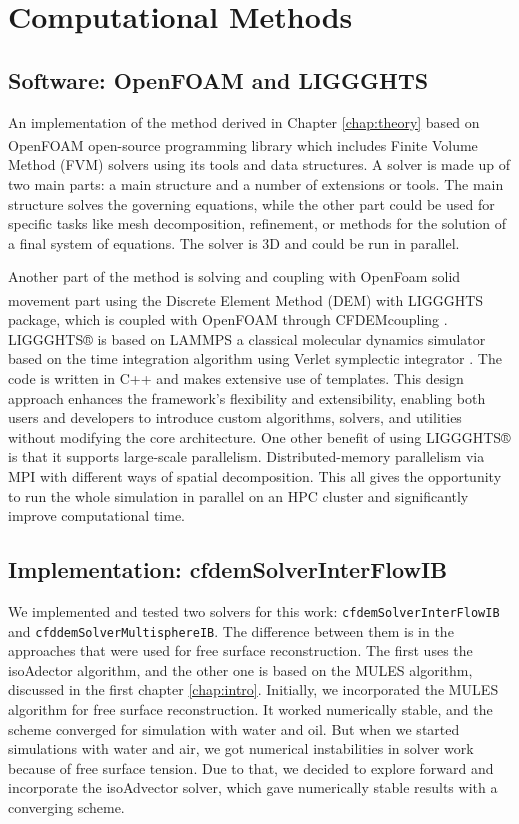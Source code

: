 \chapter{Computational Methods} \label{chap:comp_met}

\section{Software: OpenFOAM and LIGGGHTS}
An implementation of the method derived in Chapter \ref{chap:theory} based on OpenFOAM\textsuperscript{\textregistered} \cite{jasak2007openfoam} open-source programming library which includes Finite Volume Method (FVM) solvers using its tools and data structures. A solver is made up of two main parts: a main structure and a number of extensions or tools. The main structure solves the governing equations, while the other part could be used for specific tasks like mesh decomposition, refinement, or methods for the solution of a final system of equations. The solver is 3D and could be run in parallel.

Another part of the method is solving and coupling with OpenFoam solid movement part using the Discrete Element Method (DEM) with LIGGGHTS\textsuperscript{\textregistered} package, which is coupled with OpenFOAM through CFDEMcoupling \cite{kloss2011liggghts}. LIGGGHTS® is based on LAMMPS \cite{LAMMPS} a classical molecular dynamics simulator based on the time integration algorithm using Verlet symplectic integrator \cite{verlet}. The code is written in C++ and makes extensive use of templates. This design approach enhances the framework's flexibility and extensibility, enabling both users and developers to introduce custom algorithms, solvers, and utilities without modifying the core architecture. One other benefit of using LIGGGHTS® is that it supports large-scale parallelism. Distributed-memory parallelism via MPI\cite{MPI} with different ways of spatial decomposition. This all gives the opportunity to run the whole simulation in parallel on an HPC cluster and significantly improve computational time.

\section{Implementation: cfdemSolverInterFlowIB}
We implemented and tested two solvers for this work: \verb|cfdemSolverInterFlowIB| and \verb|cfddemSolverMultisphereIB|. The difference between them is in the approaches that were used for free surface reconstruction. The first uses the isoAdector \cite{roenby2019isoadvector} algorithm, and the other one is based on the MULES \cite{MULES} algorithm, discussed in the first chapter \ref{chap:intro}. Initially, we incorporated the MULES algorithm for free surface reconstruction. It worked numerically stable, and the scheme converged for simulation with water and oil. But when we started simulations with water and air, we got numerical instabilities in solver work because of free surface tension. Due to that, we decided to explore forward and incorporate the isoAdvector solver, which gave numerically stable results with a converging scheme.


